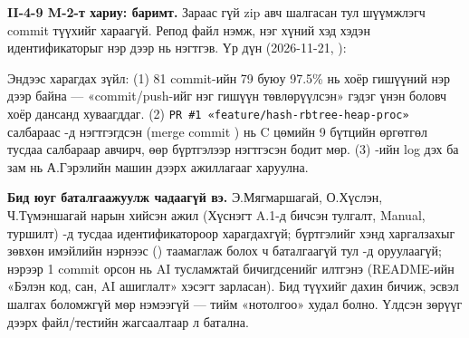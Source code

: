 \textbf{II-4-9 M-2-т хариу:  баримт.} Зараас гүй zip авч шалгасан тул шүүмжлэгч commit түүхийг хараагүй. Репод  файл нэмж, нэг хүний хэд хэдэн идентификаторыг нэр дээр нь нэгтгэв. Үр дүн (2026-11-21, ):


Эндээс харагдах зүйл: (1) 81 commit-ийн 79 буюу 97.5\% нь хоёр гишүүний нэр дээр байна --- «commit/push-ийг нэг гишүүн төвлөрүүлсэн» гэдэг үнэн боловч хоёр дансанд хуваагддаг. (2) \texttt{PR \#1 «feature/hash-rbtree-heap-proc»} салбараас -д нэгтгэгдсэн (merge commit ) нь C цөмийн 9 бүтцийн өргөтгөл тусдаа салбараар авчирч, өөр бүртгэлээр нэгтгэсэн бодит мөр. (3) -ийн log дэх  ба  зам нь А.Гэрэлийн машин дээрх ажиллагааг харуулна.

\textbf{Бид юуг баталгаажуулж чадаагүй вэ.} Э.Мягмаршагай, О.Хүслэн, Ч.Түмэншагай нарын хийсэн ажил (Хүснэгт A.1-д бичсэн тулгалт, Manual, туршилт) -д тусдаа идентификатороор харагдахгүй;  бүртгэлийг хэнд харгалзахыг зөвхөн имэйлийн нэрнээс () таамаглаж болох ч баталгаагүй тул -д оруулаагүй;  нэрээр 1 commit орсон нь AI тусламжтай бичигдсенийг илтгэнэ (README-ийн «Бэлэн код, сан, AI ашиглалт» хэсэгт зарласан). Бид түүхийг дахин бичиж, эсвэл шалгах боломжгүй  мөр нэмээгүй --- тийм «нотолгоо» худал болно. Үлдсэн зөрүүг дээрх файл/тестийн жагсаалтаар л батална.


